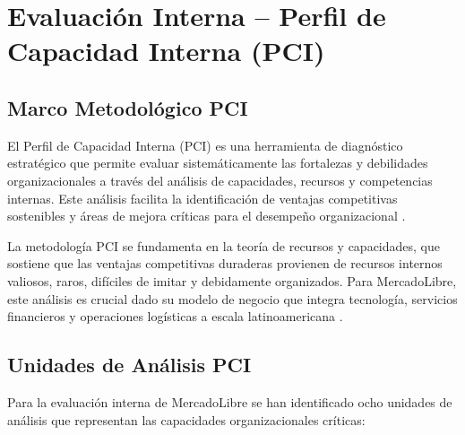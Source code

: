 \section{Evaluación Interna -- Perfil de Capacidad Interna (PCI)}
\label{sec:evaluacion_interna}

\subsection{Marco Metodológico PCI}

El Perfil de Capacidad Interna (PCI) es una herramienta de diagnóstico estratégico que permite evaluar sistemáticamente las fortalezas y debilidades organizacionales a través del análisis de capacidades, recursos y competencias internas. Este análisis facilita la identificación de ventajas competitivas sostenibles y áreas de mejora críticas para el desempeño organizacional \autocite{barney1991}.

La metodología PCI se fundamenta en la teoría de recursos y capacidades, que sostiene que las ventajas competitivas duraderas provienen de recursos internos valiosos, raros, difíciles de imitar y debidamente organizados. Para MercadoLibre, este análisis es crucial dado su modelo de negocio que integra tecnología, servicios financieros y operaciones logísticas a escala latinoamericana \autocite{teece2007}.

\subsection{Unidades de Análisis PCI}

Para la evaluación interna de MercadoLibre se han identificado ocho unidades de análisis que representan las capacidades organizacionales críticas:

